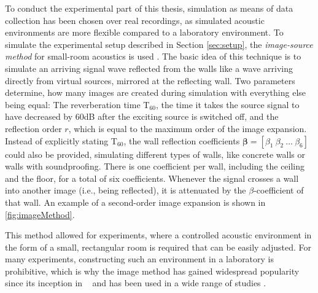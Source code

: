 To conduct the experimental part of this thesis, simulation as means of data collection has been chosen over real recordings, as simulated acoustic environments are more flexible compared to a laboratory environment. To simulate the experimental setup described in Section \ref{sec:setup}, the \emph{image-source method} for small-room acoustics is used \cite{Allen1979}. The basic idea of this technique is to simulate an arriving signal wave reflected from the walls like a wave arriving directly from virtual sources, mirrored at the reflecting wall. Two parameters determine, how many images are created during simulation with everything else being equal: The reverberation time T$_{60}$, the time it takes the source signal to have decreased by 60dB after the exciting source is switched off, and the reflection order $r$, which is equal to the maximum order of the image expansion. Instead of explicitly stating T$_{60}$, the wall reflection coefficients $\bm\beta = [\beta_1~\beta_2~\dots~\beta_6]$ could also be provided, simulating different types of walls, like concrete walls or walls with soundproofing. There is one coefficient per wall, including the ceiling and the floor, for a total of six coefficients. Whenever the signal crosses a wall into another image (i.e., being reflected), it is attenuated by the $\beta$-coefficient of that wall. An example of a second-order image expansion is shown in \autoref{fig:imageMethod}.

This method allowed for experiments, where a controlled acoustic environment in the form of a small, rectangular room is required that can be easily adjusted. For many experiments, constructing such an environment in a laboratory is prohibitive, which is why the image method has gained widespread popularity since its inception in \citeyear{Allen1979}~\cite{Allen1979} and has been used in a wide range of studies \cite{Champagne1996}.